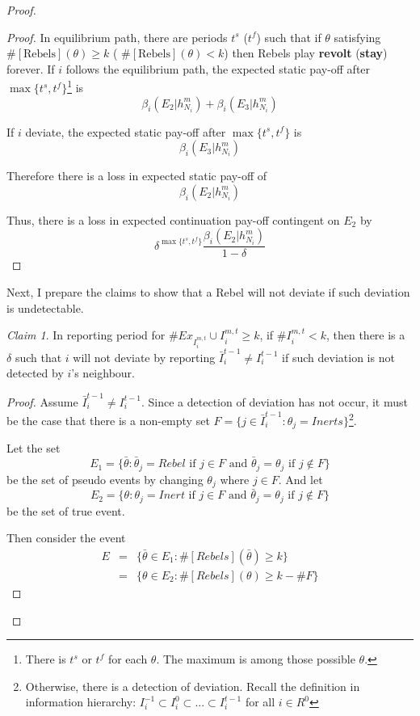 \documentclass[12pt,letter]{article}
\theoremstyle{definition}
\theoremstyle{remark}
\theoremstyle{claim}
\newtheorem{claim}{Claim}
\begin{document}
\begin{proof}
\begin{proof}
In equilibrium path, there are periods $t^{s}$ ($t^{f}$) such that if $\theta$ satisfying $\#[\text{Rebels}](\theta)\geq k$ ( $\#[\text{Rebels}](\theta)< k$) then Rebels play \textbf{revolt} (\textbf{stay}) forever. If $i$ follows the equilibrium path, the expected static pay-off after $\max\{t^s,t^f\}$\footnote{There is $t^{s}$ or $t^{f}$ for each $\theta$. The maximum is among those possible $\theta$.} is
 \[\beta_{i}(E_2|h^{m}_{N_i})+\beta_{i}(E_3|h^{m}_{N_i})\]

If $i$ deviate, the expected static pay-off after $\max\{t^s,t^f\}$ is
 \[\beta_{i}(E_3|h^{m}_{N_i})\]
 
Therefore there is a loss in expected static pay-off of
\[\beta_{i}(E_2|h^{m}_{N_i})\]

Thus, there is a loss in expected continuation pay-off contingent on $E_2$ by
\[\delta^{\max\{t^s,t^f\}}\frac{\beta_{i}(E_2|h^{m}_{N_i})}{1-\delta}\]

\end{proof}


Next, I prepare the claims to show that a Rebel will not deviate if such deviation is undetectable.

\begin{claim} 
\label{claim_deviation_higher_reporting}
In reporting period for $\# Ex_{I^{m,t}_i}\cup I^{m,t}_i \geq k$, if $\# I^{m,t}_i<k$, then there is a $\delta$ such that $i$ will not deviate by reporting $\bar{I}^{t-1}_i\neq I^{t-1}_i$ if such deviation is not detected by $i$'s neighbour.
\end{claim}

\begin{proof}
Assume $\bar{I}^{t-1}_i\neq I^{t-1}_i$. Since a detection of deviation has not occur, it must be the case that there is a non-empty set $F=\{j\in \bar{I}^{t-1}_i:\theta_j=Inerts\}$\footnote{Otherwise, there is a detection of deviation. Recall the definition in information hierarchy: $I^{-1}_i\subset I^{0}_i\subset...\subset I^{t-1}_i$ for all $i\in R^0$}. 


Let the set 
\[E_1=\{\bar{\theta}: \bar{\theta}_j=Rebel \text{ if } j\in F \text { and }\bar{\theta}_j=\theta_j \text{ if } j\notin F\}\]
be the set of pseudo events by changing $\theta_j$ where $j\in F$. And let
\[E_2=\{\theta: \theta_j=Inert \text{ if }j\in F \text { and }\bar{\theta}_j=\theta_j \text{ if } j\notin F\}\]
be the set of true event.

Then consider the event
\begin{eqnarray*}
E 	&= &\{\bar{\theta}\in E_1: \#[Rebels](\bar{\theta})\geq k\}\\
 	&= &\{\theta\in E_2: \#[Rebels](\theta)\geq k-\#F\}
\end{eqnarray*}


\end{proof}
\end{proof}
\end{document}
